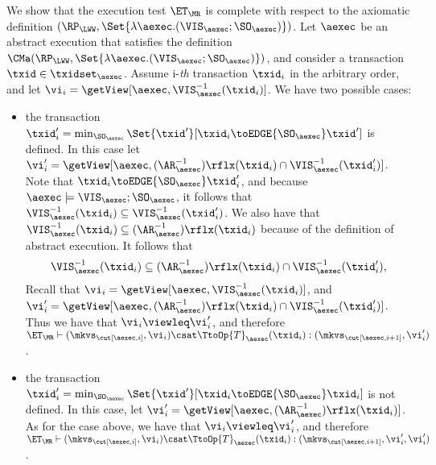 We show that the execution test $\ET_{\MR}$ is complete 
with respect to the axiomatic definition $(\RP_{\LWW}, \Set{\lambda \aexec.(\VIS_{\aexec};\SO_{\aexec})})$. 
Let $\aexec$ be an abstract execution that satisfies the definition
$\CMa(\RP_{\LWW}, \Set{\lambda \aexec.(\VIS_{\aexec};\SO_{\aexec})})$, 
and consider a transaction $\txid \in \txidset_{\aexec}$. 
Assume i-\emph{th} transaction \( \txid_i \) in the arbitrary order,
and let $\vi_i = \getView[\aexec, \VIS^{-1}_{\aexec}(\txid_{i})]$.
We have two possible cases: 
\begin{itemize}
    \item the transaction $\txid'_{i} = \min_{\SO_{\aexec}}\Set{\txid' }[ \txid_{i} \toEDGE{\SO_{\aexec}} \txid']$ is 
defined. In this case let $\vi'_{i} =\getView[\aexec, (\AR^{-1}_{\aexec})\rflx(\txid_{i}) \cap \VIS^{-1}_{\aexec}(\txid'_{i})]$. 
Note that $\txid_{i} \toEDGE{\SO_{\aexec}} \txid'_{i}$, and because $\aexec \models \VIS_{\aexec} ; \SO_{\aexec}$, 
it follows that $\VIS^{-1}_{\aexec}(\txid_{i}) \subseteq \VIS^{-1}_{\aexec}(\txid'_{i})$. 
We also have that $\VIS^{-1}_{\aexec}(\txid_{i}) \subseteq (\AR^{-1}_{\aexec})\rflx(\txid_{i})$ because of 
the definition of abstract execution. It follows that 
\[
\VIS^{-1}_{\aexec}(\txid_{i}) \subseteq (\AR^{-1}_{\aexec})\rflx(\txid_{i}) \cap \VIS^{-1}_{\aexec}(\txid'_{i}),
\]
Recall that  $\vi_i = \getView[\aexec, \VIS^{-1}_{\aexec}(\txid_{i})]$,
and $\vi'_{i} =\getView[\aexec, (\AR^{-1}_{\aexec})\rflx(\txid_{i}) \cap \VIS^{-1}_{\aexec}(\txid'_{i})]$.
Thus we have that $\vi_i \viewleq \vi'_{i}$, and therefore $\ET_{\MR} \vdash (\mkvs_{\cut[\aexec, i]}, \vi_i) 
\csat \TtoOp{T}_{\aexec}(\txid_{i}) : (\mkvs_{\cut[\aexec, i+1]},\vi'_{i})$. 
\item the transaction $\txid'_{i} = \min_{\SO_{\aexec}}\Set{\txid' }[ \txid_{i} \toEDGE{\SO_{\aexec}} \txid_{i}]$ 
is not defined. In this case, let $\vi'_{i} = \getView[\aexec, (\AR^{-1}_{\aexec})\rflx(\txid_{i})]$.
As for the case above, we have that $\vi_i \viewleq \vi'_{i}$, and therefore 
$\ET_{\MR} \vdash (\mkvs_{\cut[\aexec, i]}, \vi_i) \csat \TtoOp{T}_{\aexec}(\txid_{i}) : (\mkvs_{\cut[\aexec, i+1]},\vi'_{i},\vi'_{i})$. 
\end{itemize}
